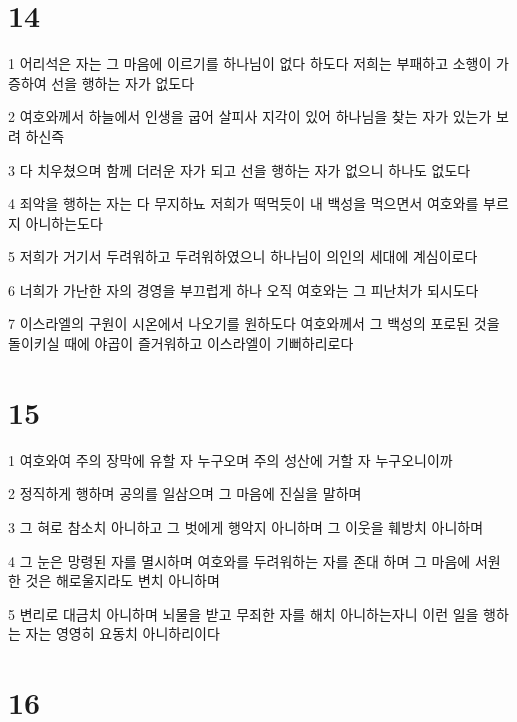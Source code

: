 \chapter{14}

\par 1 어리석은 자는 그 마음에 이르기를 하나님이 없다 하도다 저희는 부패하고 소행이 가증하여 선을 행하는 자가 없도다
\par 2 여호와께서 하늘에서 인생을 굽어 살피사 지각이 있어 하나님을 찾는 자가 있는가 보려 하신즉
\par 3 다 치우쳤으며 함께 더러운 자가 되고 선을 행하는 자가 없으니 하나도 없도다
\par 4 죄악을 행하는 자는 다 무지하뇨 저희가 떡먹듯이 내 백성을 먹으면서 여호와를 부르지 아니하는도다
\par 5 저희가 거기서 두려워하고 두려워하였으니 하나님이 의인의 세대에 계심이로다
\par 6 너희가 가난한 자의 경영을 부끄럽게 하나 오직 여호와는 그 피난처가 되시도다
\par 7 이스라엘의 구원이 시온에서 나오기를 원하도다 여호와께서 그 백성의 포로된 것을 돌이키실 때에 야곱이 즐거워하고 이스라엘이 기뻐하리로다

\chapter{15}

\par 1 여호와여 주의 장막에 유할 자 누구오며 주의 성산에 거할 자 누구오니이까
\par 2 정직하게 행하며 공의를 일삼으며 그 마음에 진실을 말하며
\par 3 그 혀로 참소치 아니하고 그 벗에게 행악지 아니하며 그 이웃을 훼방치 아니하며
\par 4 그 눈은 망령된 자를 멸시하며 여호와를 두려워하는 자를 존대 하며 그 마음에 서원한 것은 해로울지라도 변치 아니하며
\par 5 변리로 대금치 아니하며 뇌물을 받고 무죄한 자를 해치 아니하는자니 이런 일을 행하는 자는 영영히 요동치 아니하리이다

\chapter{16}

